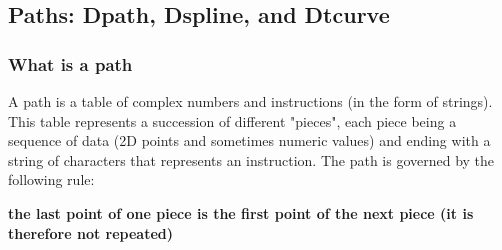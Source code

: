 \subsection{Paths: Dpath, Dspline, and Dtcurve}\label{Dpath}

\subsubsection{What is a path}

A path is a table of complex numbers and instructions (in the form of strings). This table represents a succession of different "pieces", each piece being a sequence of data (2D points and sometimes numeric values) and ending with a string of characters that represents an instruction. The path is governed by the following rule: \par
\hfil\textbf{the last point of one piece is the first point of the next piece (it is therefore not repeated) }\hfil\par

